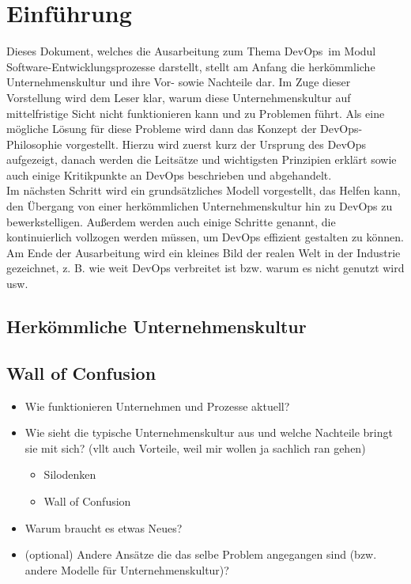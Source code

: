 
\chapter{Einführung}

Dieses Dokument, welches die Ausarbeitung zum Thema \glqq DevOps\grqq\ im Modul Software-Entwicklungsprozesse darstellt, stellt am Anfang die herkömmliche Unternehmenskultur und ihre Vor- sowie Nachteile dar. Im Zuge dieser Vorstellung wird dem Leser klar, warum diese Unternehmenskultur auf mittelfristige Sicht nicht funktionieren kann und zu Problemen führt. Als eine mögliche Lösung für diese Probleme wird dann das Konzept der \ac{DevOps}-Philosophie vorgestellt. Hierzu wird zuerst kurz der Ursprung des \ac{DevOps} aufgezeigt, danach werden die Leitsätze und wichtigsten Prinzipien erklärt sowie auch einige Kritikpunkte an \ac{DevOps} beschrieben und abgehandelt.\\
Im nächsten Schritt wird ein grundsätzliches Modell vorgestellt, das Helfen kann, den Übergang von einer herkömmlichen Unternehmenskultur hin zu \ac{DevOps} zu bewerkstelligen. Außerdem werden auch einige Schritte genannt, die kontinuierlich vollzogen werden müssen, um \ac{DevOps} effizient gestalten zu können.\\
Am Ende der Ausarbeitung wird ein kleines Bild der realen Welt in der Industrie gezeichnet, z. B. wie weit \ac{DevOps} verbreitet ist bzw. warum es nicht genutzt wird usw.

\section{Herkömmliche Unternehmenskultur}



\section{Wall of Confusion}

\begin{itemize}
\item Wie funktionieren Unternehmen und Prozesse aktuell?
\item Wie sieht die typische Unternehmenskultur aus und welche Nachteile bringt sie mit sich? (vllt auch Vorteile, weil mir wollen ja sachlich ran gehen)
	\begin{itemize}
	\item Silodenken
	\item Wall of Confusion
	\end{itemize}
\item Warum braucht es etwas Neues?
\item (optional) Andere Ansätze die das selbe Problem angegangen sind (bzw. andere Modelle für Unternehmenskultur)?
\end{itemize}

